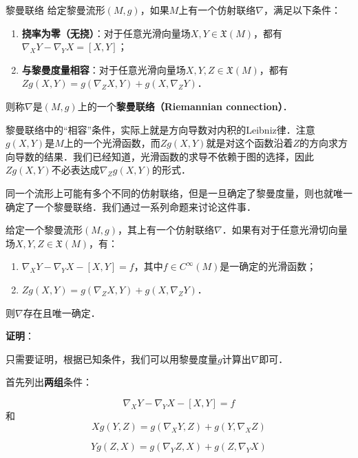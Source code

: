 \begin{definition}{黎曼联络}
给定黎曼流形$(M, g)$，如果$M$上有一个仿射联络$\nabla$，满足以下条件：
\begin{enumerate}
\item \textbf{挠率为零（无挠）}：对于任意光滑向量场$X, Y\in\mathfrak{X}(M)$，都有$\nabla_XY-\nabla_YX={[X, Y]}$；
\item \textbf{与黎曼度量相容}：对于任意光滑向量场$X, Y, Z\in\mathfrak{X}(M)$，都有$Zg(X, Y)=g(\nabla_ZX, Y)+g(X, \nabla_ZY)$．
\end{enumerate}
则称$\nabla$是$(M, g)$上的一个\textbf{黎曼联络（Riemannian connection）}．
\end{definition}

黎曼联络中的“相容”条件，实际上就是方向导数对内积的Leibniz律．注意$g(X, Y)$是$M$上的一个光滑函数，而$Zg(X, Y)$就是对这个函数沿着$Z$的方向求方向导数的结果．我们已经知道，光滑函数的求导不依赖于图的选择，因此$Zg(X, Y)$不必表达成$\nabla_Zg(X, Y)$的形式．

同一个流形上可能有多个不同的仿射联络，但是一旦确定了黎曼度量，则也就唯一确定了一个黎曼联络．我们通过一系列命题来讨论这件事．

\begin{theorem}{}
给定一个黎曼流形$(M, g)$，其上有一个仿射联络$\nabla$．如果有对于任意光滑切向量场$X, Y, Z\in\mathfrak{X}(M)$，有：
\begin{enumerate}
\item $\nabla_XY-\nabla_YX-[X, Y]=f$，其中$f\in C^\infty(M)$是一确定的光滑函数；
\item $Zg(X, Y)=g(\nabla_ZX, Y)+g(X, \nabla_ZY)$．
\end{enumerate}
则$\nabla$存在且唯一确定．
\end{theorem}

\textbf{证明}：

只需要证明，根据已知条件，我们可以用黎曼度量$g$计算出$\nabla$即可．

首先列出\textbf{两组}条件：

\begin{equation}\label{RieCon_eq1}
\nabla_XY-\nabla_YX-[X, Y]=f
\end{equation}
和
\begin{equation}\label{RieCon_eq2}
Xg(Y, Z)=g(\nabla_XY, Z)+g(Y, \nabla_XZ)
\end{equation}

\begin{equation}\label{RieCon_eq3}
Yg(Z, X)=g(\nabla_YZ, X)+g(Z, \nabla_YX)
\end{equation}

